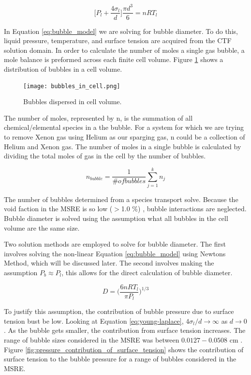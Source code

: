 \begin{equation}
 	\bigg[P_{l} + \frac{4 \sigma_{l}}{d} \bigg] \frac{\pi d^{3}}{6} = nRT_{l}
	\label{eq:bubble_model}
\end{equation}

In Equation \ref{eq:bubble_model} we are solving for bubble diameter. To do this, liquid pressure, temperature, and surface tension are acquired from the CTF solution domain. In order to calculate the number of moles a single gas bubble, a mole balance is preformed across each finite cell volume. Figure \ref{fig:bubbles_in_cell} shows a distribution of bubbles in a cell volume. 

\begin{figure}[ht]
  \centering
  \texttt{[image: bubbles\_in\_cell.png]}\\
  \caption{Bubbles dispersed in cell volume.}
  \label{fig:bubbles_in_cell}
\end{figure} 

The number of moles, represented by n, is the summation of all chemical/elemental species in a the bubble. For a system for which we are trying to remove Xenon gas using Helium as our sparging gas, n could be a collection of Helium and Xenon gas. The number of moles in a single bubble is calculated by dividing the total moles of gas in the cell by the number of bubbles. 

 \begin{equation}
 	n_{bubble} = \frac{1}{\# of bubbles} \sum_{j=1}^{k} n_{j}
\end{equation}

The number of bubbles determined from a species transport solve. Because the void faction in the MSRE is so low ($>$1.0 \%) \cite{engel1971}, bubble interactions are neglected. Bubble diameter is solved using the assumption what all bubbles in the cell volume are the same size. 

Two solution methods are employed to solve for bubble diameter. The first involves solving the non-linear Equation \ref{eq:bubble_model} using Newtons Method, which will be discussed later. The second involves making the assumption $P_{b} \approx P_{l}$, this allows for the direct calculation of bubble diameter. 

\begin{equation}
 	D = \bigg(\frac{6nRT_{l}}{\pi P_{l}} \bigg)^{1/3}
	\label{eq:direct_bubble_solve}
\end{equation}

To justify this assumption, the contribution of bubble pressure due to surface tension bust be low. Looking at Equation \ref{eq:young-laplace},  $ 4\sigma_{l}/d \rightarrow \infty$ as $d \rightarrow 0$. As the bubble gets smaller, the contribution from surface tension increases. The range of bubble sizes considered in the MSRE was between $0.0127 - 0.0508$ cm \cite{engel1971}. Figure \ref{fig:pressure_contribution_of_surface_tension} shows the contribution of surface tension to the bubble pressure for a range of bubbles considered in the MSRE. 

